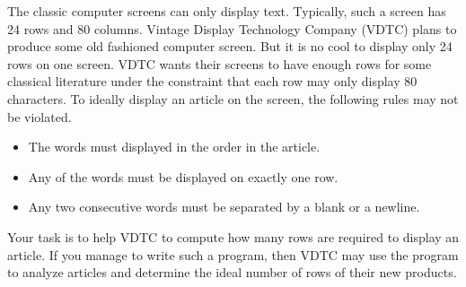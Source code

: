 The classic computer screens can only display text.
Typically, such a screen has 24 rows and 80 columns.
Vintage Display Technology Company (VDTC) plans to produce some old fashioned 
computer screen. 
But it is no cool to display only 24 rows on one screen.
VDTC wants their screens to have enough rows for some classical literature
under the constraint that each row may only display 80 characters.
To ideally display an article on the screen, the following rules may not be
violated.
\begin{itemize}
\tightlist
\item The words must displayed in the order in the article.
\item Any of the words must be displayed on exactly one row. 
\item Any two consecutive words must be separated by a blank or a newline. 
\end{itemize}

Your task is to help VDTC to compute how many rows are required to display
an article. If you manage to write such a program, then VDTC may use the 
program to analyze articles and determine the ideal number of rows of 
their new products.

